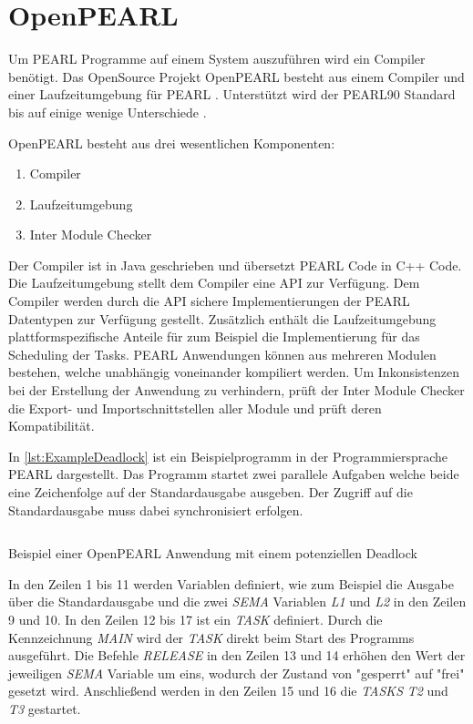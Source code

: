 \section{OpenPEARL}
\label{section:OpenPEARL}
Um PEARL Programme auf einem System auszuführen wird ein Compiler benötigt. Das
OpenSource Projekt OpenPEARL besteht aus einem Compiler und einer
Laufzeitumgebung für PEARL \autocite{OpenPEARL}. Unterstützt wird der PEARL90
Standard bis auf einige wenige Unterschiede
\autocite{OpenPEARL_Differences_To_PEARL90}.

OpenPEARL besteht aus drei wesentlichen Komponenten:
\begin{enumerate}
  \item Compiler
  \item Laufzeitumgebung
  \item Inter Module Checker
\end{enumerate}
Der Compiler ist in Java geschrieben und übersetzt PEARL Code in C++ Code. Die
Laufzeitumgebung stellt dem Compiler eine API zur Verfügung. Dem Compiler werden
durch die API sichere Implementierungen der PEARL Datentypen zur Verfügung
gestellt. Zusätzlich enthält die Laufzeitumgebung plattformspezifische Anteile
für zum Beispiel die Implementierung für das Scheduling der Tasks. PEARL
Anwendungen können aus mehreren Modulen bestehen, welche unabhängig voneinander
kompiliert werden. Um Inkonsistenzen bei der Erstellung der Anwendung zu
verhindern, prüft der Inter Module Checker die Export- und Importschnittstellen
aller Module und prüft deren Kompatibilität.

In \cref{lst:ExampleDeadlock} ist ein Beispielprogramm in der Programmiersprache
PEARL dargestellt. Das Programm startet zwei parallele Aufgaben welche beide
eine Zeichenfolge auf der Standardausgabe ausgeben. Der Zugriff auf die
Standardausgabe muss dabei synchronisiert erfolgen.

\begin{listing}[ht]
  \inputminted[frame=lines,linenos]{vim}{./Examples/Example_Deadlock.prl}
  \caption{Beispiel einer OpenPEARL Anwendung mit einem potenziellen Deadlock}
  \label{lst:ExampleDeadlock}   
\end{listing} 

In den Zeilen 1 bis 11 werden Variablen definiert, wie zum Beispiel die Ausgabe
über die Standardausgabe und die zwei \textit{SEMA} Variablen \textit{L1} und
\textit{L2} in den Zeilen 9 und 10. In den Zeilen 12 bis 17 ist ein
\textit{TASK} definiert. Durch die Kennzeichnung \textit{MAIN} wird der
\textit{TASK} direkt beim Start des Programms ausgeführt. Die Befehle
\textit{RELEASE} in den Zeilen 13 und 14 erhöhen den Wert der jeweiligen
\textit{SEMA} Variable um eins, wodurch der Zustand von "gesperrt" auf "frei"
gesetzt wird. Anschließend werden in den Zeilen 15 und 16 die \textit{TASKS}
\textit{T2} und \textit{T3} gestartet.

